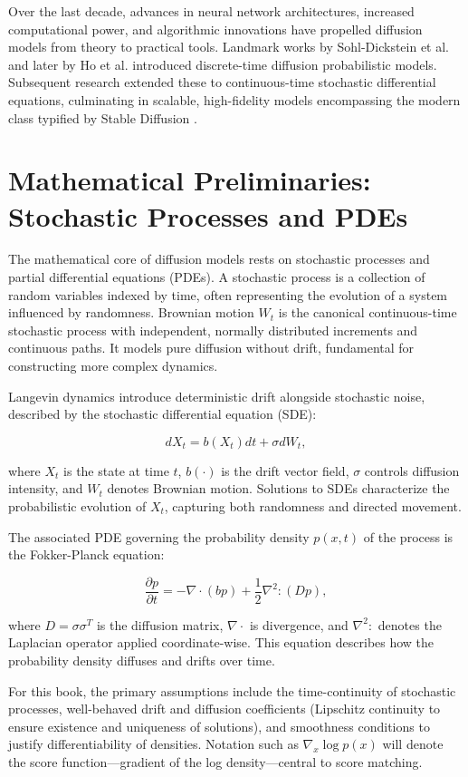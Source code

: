 \documentclass[a4paper,12pt,oneside]{memoir}
\begin{document}
Over the last decade, advances in neural network architectures, increased computational power, and algorithmic innovations have propelled diffusion models from theory to practical tools. Landmark works by Sohl-Dickstein et al. \cite{Sohl-Dickstein2015} and later by Ho et al. \cite{Ho2020} introduced discrete-time diffusion probabilistic models. Subsequent research extended these to continuous-time stochastic differential equations, culminating in scalable, high-fidelity models encompassing the modern class typified by Stable Diffusion \cite{Rombach2022}.

\section{Mathematical Preliminaries: Stochastic Processes and PDEs}

The mathematical core of diffusion models rests on stochastic processes and partial differential equations (PDEs). A stochastic process is a collection of random variables indexed by time, often representing the evolution of a system influenced by randomness. Brownian motion \( W_t \) is the canonical continuous-time stochastic process with independent, normally distributed increments and continuous paths. It models pure diffusion without drift, fundamental for constructing more complex dynamics.

Langevin dynamics introduce deterministic drift alongside stochastic noise, described by the stochastic differential equation (SDE):

\[
dX_t = b(X_t) dt + \sigma dW_t,
\]

where \( X_t \) is the state at time \( t \), \( b(\cdot) \) is the drift vector field, \( \sigma \) controls diffusion intensity, and \( W_t \) denotes Brownian motion. Solutions to SDEs characterize the probabilistic evolution of \( X_t \), capturing both randomness and directed movement.

The associated PDE governing the probability density \( p(x,t) \) of the process is the Fokker-Planck equation:

\[
\frac{\partial p}{\partial t} = -\nabla \cdot (b p) + \frac{1}{2} \nabla^2 : (D p),
\]

where \( D = \sigma \sigma^T \) is the diffusion matrix, \( \nabla \cdot \) is divergence, and \( \nabla^2 : \) denotes the Laplacian operator applied coordinate-wise. This equation describes how the probability density diffuses and drifts over time.

For this book, the primary assumptions include the time-continuity of stochastic processes, well-behaved drift and diffusion coefficients (Lipschitz continuity to ensure existence and uniqueness of solutions), and smoothness conditions to justify differentiability of densities. Notation such as \( \nabla_x \log p(x) \) will denote the score function—gradient of the log density—central to score matching.
\end{document}
